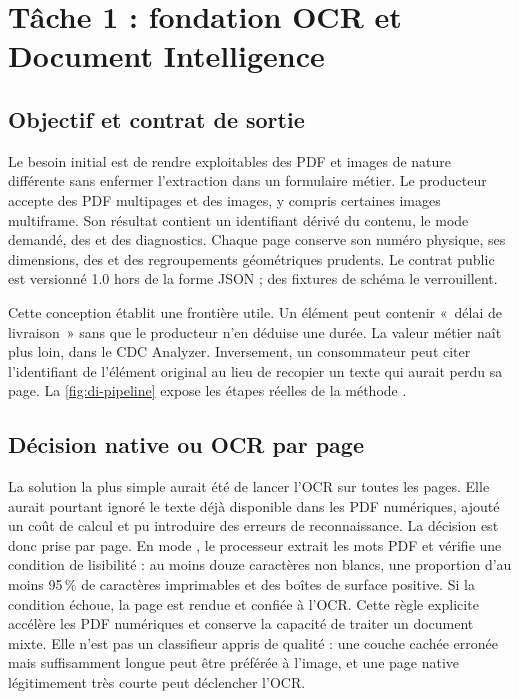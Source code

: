 \chapter{Tâche 1 : fondation OCR et Document Intelligence}\label{chap:di}
\section{Objectif et contrat de sortie}
Le besoin initial est de rendre exploitables des PDF et images de nature différente sans enfermer l'extraction dans un formulaire métier. Le producteur \texttt{} accepte des PDF multipages et des images, y compris certaines images multiframe. Son résultat \texttt{} contient un identifiant dérivé du contenu, le mode demandé, des \texttt{} et des diagnostics. Chaque page conserve son numéro physique, ses dimensions, des \texttt{} et des regroupements géométriques prudents. Le contrat public est versionné 1.0 hors de la forme JSON ; des fixtures de schéma le verrouillent.

Cette conception établit une frontière utile. Un élément peut contenir «~délai de livraison~» sans que le producteur n'en déduise une durée. La valeur métier naît plus loin, dans le CDC Analyzer. Inversement, un consommateur peut citer l'identifiant de l'élément original au lieu de recopier un texte qui aurait perdu sa page. La \autoref{fig:di-pipeline} expose les étapes réelles de la méthode \texttt{}.



\section{Décision native ou OCR par page}
La solution la plus simple aurait été de lancer l'OCR sur toutes les pages. Elle aurait pourtant ignoré le texte déjà disponible dans les PDF numériques, ajouté un coût de calcul et pu introduire des erreurs de reconnaissance. La décision est donc prise par page. En mode \texttt{}, le processeur extrait les mots PDF et vérifie une condition de lisibilité : au moins douze caractères non blancs, une proportion d'au moins 95\,\% de caractères imprimables et des boîtes de surface positive. Si la condition échoue, la page est rendue et confiée à l'OCR. Cette règle explicite accélère les PDF numériques et conserve la capacité de traiter un document mixte. Elle n'est pas un classifieur appris de qualité : une couche cachée erronée mais suffisamment longue peut être préférée à l'image, et une page native légitimement très courte peut déclencher l'OCR.

